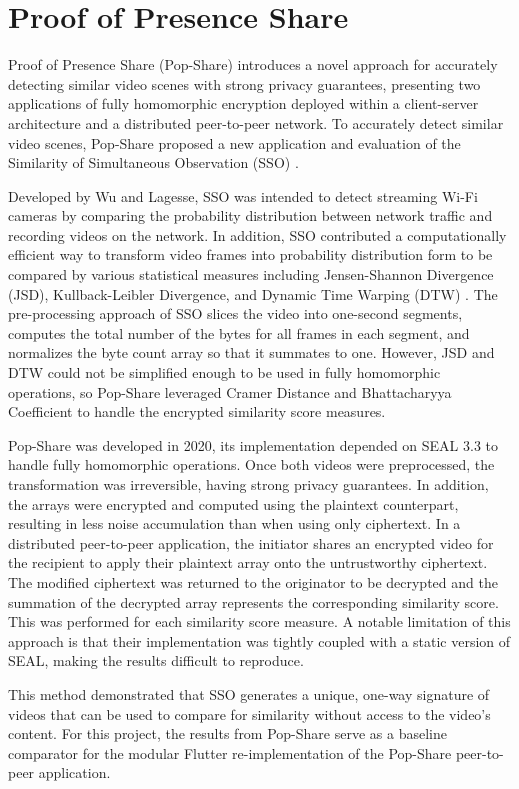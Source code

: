 \section{Proof of Presence Share}
\label{sec:Related Pop-Share}
Proof of Presence Share (Pop-Share) \cite{Lagesse2021-PopShare} introduces a novel approach for accurately detecting similar video scenes with strong privacy guarantees, presenting two applications of fully homomorphic encryption deployed within a client-server architecture and a distributed peer-to-peer network. To accurately detect similar video scenes, Pop-Share proposed a new application and evaluation of the Similarity of Simultaneous Observation (SSO) \cite{Wu2019-SSO}. 

Developed by Wu and Lagesse, SSO was intended to detect streaming Wi-Fi cameras by comparing the probability distribution between network traffic and recording videos on the network. In addition, SSO contributed a computationally efficient way to transform video frames into probability distribution form to be compared by various statistical measures including Jensen-Shannon Divergence (JSD), Kullback-Leibler Divergence, and Dynamic Time Warping (DTW) \cite{Sakoe1978-dtw}. The pre-processing approach of SSO slices the video into one-second segments, computes the total number of the bytes for all frames in each segment, and normalizes the byte count array so that it summates to one. However, JSD and DTW could not be simplified enough to be used in fully homomorphic operations, so Pop-Share leveraged Cramer Distance and Bhattacharyya Coefficient to handle the encrypted similarity score measures.

Pop-Share was developed in 2020, its implementation depended on SEAL 3.3 to handle fully homomorphic operations. Once both videos were preprocessed, the transformation was irreversible, having strong privacy guarantees. In addition, the arrays were encrypted and computed using the plaintext counterpart, resulting in less noise accumulation than when using only ciphertext. In a distributed peer-to-peer application, the initiator shares an encrypted video for the recipient to apply their plaintext array onto the untrustworthy ciphertext. The modified ciphertext was returned to the originator to be decrypted and the summation of the decrypted array represents the corresponding similarity score. This was performed for each similarity score measure. A notable limitation of this approach is that their implementation was tightly coupled with a static version of SEAL, making the results difficult to reproduce.

This method demonstrated that SSO generates a unique, one-way signature of videos that can be used to compare for similarity without access to the video's content. For this project, the results from Pop-Share serve as a baseline comparator for the modular Flutter re-implementation of the Pop-Share peer-to-peer application.
